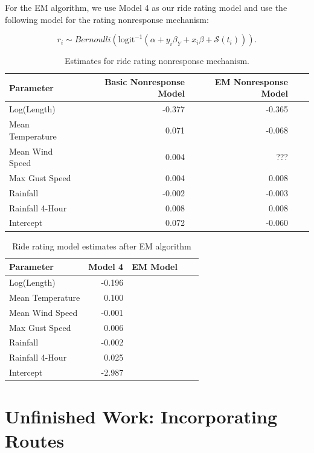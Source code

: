 \documentclass[12pt,twoside]{reedthesis}
\begin{document}
  For the EM algorithm, we use Model 4 as our ride rating model and use
  the following model for the rating nonresponse mechanism:
  
  \begin{equation}
  r_i \sim Bernoulli(\text{logit}^{-1} (\alpha + y_i \beta_Y + x_i \beta + \mathcal{S}(t_i))).
  \end{equation}
  
  \begin{table}[htb]
  \caption{Estimates for ride rating nonresponse mechanism. \label{tab:nonresponse-estimates}}
  \centering
  \begin{tabular}{lrrrr}
  \toprule
  \textbf{Parameter} & \textbf{Basic Nonresponse Model} & \textbf{EM Nonresponse Model}\\
  \midrule
  Log(Length) & -0.377 & -0.365\\
  Mean Temperature & 0.071 & -0.068\\
  Mean Wind Speed & 0.004 & ???\\
  Max Gust Speed & 0.004 & 0.008\\
  Rainfall & -0.002 & -0.003\\
  Rainfall 4-Hour & 0.008 & 0.008\\
  Intercept & 0.072 & -0.060\\
  \bottomrule
  \end{tabular}
  \end{table}
  
  \begin{table}[htb]
  \caption{Ride rating model estimates after EM algorithm \label{tab:em-model-estimates}}
  \centering
  \begin{tabular}{lrrrr}
  \toprule
  \textbf{Parameter} & \textbf{Model 4} & \textbf{EM Model}\\
  \midrule
  Log(Length) & -0.196 & \\
  Mean Temperature & 0.100 & \\
  Mean Wind Speed & -0.001 & \\
  Max Gust Speed & 0.006 & \\
  Rainfall & -0.002 & \\
  Rainfall 4-Hour & 0.025 & \\
  Intercept & -2.987 & \\
  \bottomrule
  \end{tabular}
  \end{table}
  
  \chapter{Unfinished Work: Incorporating
  Routes}\label{unfinished-work-incorporating-routes}
  
\end{document}

